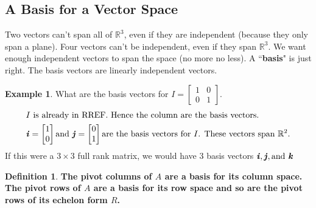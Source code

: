 \documentclass[12pt, letterpaper]{article}
\newcommand{\R}[1]{$\mathbb{R}^{#1}$}
\newcommand{\V}[1]{\textbf{\textit{#1}}}
\newcommand{\DefinitionSpace}{\vspace{15px}}
\theoremstyle{definition}
\newtheorem{definition}{Definition}[section]
\newtheorem{example}{Example}
\begin{document}
	
	
\subsection{A Basis for a Vector Space}
		Two vectors can't span all of \R{3}, even if they are independent (because they only span a plane). Four vectors can't be independent, even if they span \R{3}. We want enough independent vectors to span the space (no more no less). A ``\textbf{basis}" is just right. The basis vectors are linearly independent vectors.
	
			 \begin{example}
			 	What are the basis vectors for $I = \begin{bmatrix} 1 & 0 \\ 0 & 1\end{bmatrix}$.
			 	\begin{gather*}
			 		\intertext{$I$ is already in RREF. Hence the column are the basis vectors.}
			 			\V{i} =  \begin{bmatrix} 1 \\ 0\end{bmatrix} \text{and } \V{j} =  \begin{bmatrix} 0 \\ 1\end{bmatrix} \text{are the basis vectors for $I$. These vectors span \R{2}.}
			 	\end{gather*}
			 	If this were a $3 \times 3$ full rank matrix, we would have 3 basis vectors $\V{i}, \V{j}, \text{and } \V{k}$
			 \end{example}
	
	\DefinitionSpace
		\begin{definition}
			\textbf{The pivot columns of $A$ are a basis for its column space. The pivot rows of $A$ are a basis for its row space and so are the pivot rows of its echelon form $R$.}
		\end{definition}
	\DefinitionSpace
	
\end{document}
